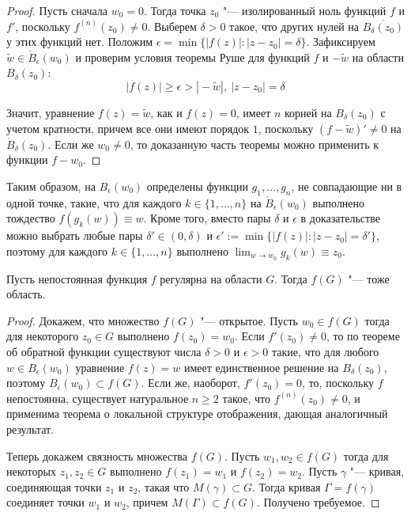 \begin{proof}
	Пусть сначала $w_0 = 0$. Тогда точка $z_0$ "--- изолированный ноль функций $f$ и $f'$, поскольку $f^{(n)}(z_0) \ne 0$. Выберем $\delta > 0$ такое, что других нулей на $\overline{B_\delta(z_0)}$ у этих функций нет. Положим $\epsilon = \min\{|f(z)| : |z - z_0| = \delta\}$. Зафиксируем $\widetilde w \in \mathring B_\epsilon(w_0)$ и проверим условия теоремы Руше для функций $f$ и $-\widetilde{w}$ на области $B_\delta(z_0)$:
	\[|f(z)| \ge \epsilon > |\!-\!\widetilde{w}|,~|z - z_0| = \delta\]
	
	Значит, уравнение $f(z) = \widetilde w$, как и $f(z) = 0$, имеет $n$ корней на $B_\delta(z_0)$ с учетом кратности, причем все они имеют порядок $1$, поскольку $(f- \widetilde w)' \ne 0$ на $\mathring B_\delta(z_0)$. Если же $w_0 \ne 0$, то доказанную часть теоремы можно применить к функции $f - w_0$.
\end{proof}

\begin{note}
	Таким образом, на $B_\epsilon(w_0)$ определены функции $g_1, \dotsc, g_n$, не совпадающие ни в одной точке, такие, что для каждого $k \in \{1, \dotsc, n\}$ на $\mathring B_\epsilon(w_0)$ выполнено тождество $f(g_k(w)) \equiv w$. Кроме того, вместо пары $\delta$ и $\epsilon$ в доказательстве можно выбрать любые пары $\delta' \in (0, \delta)$ и $\epsilon' := \min\{|f(z)| : |z - z_0| = \delta'\}$, поэтому для каждого $k \in \{1, \dotsc, n\}$ выполнено $\lim_{w \to w_0}g_k(w) \equiv z_0$.
\end{note}

\begin{theorem}
	Пусть непостоянная функция $f$ регулярна на области $G$. Тогда $f(G)$ "--- тоже область.
\end{theorem}

\begin{proof}
	Докажем, что множество $f(G)$ "--- открытое. Пусть $w_0 \in f(G)$ тогда для некоторого $z_0 \in G$ выполнено $f(z_0) = w_0$. Если $f'(z_0) \ne 0$, то по теореме об обратной функции существуют числа $\delta > 0$ и $\epsilon > 0$ такие, что для любого $w \in B_\epsilon(w_0)$ уравнение $f(z) = w$ имеет единственное решение на $B_\delta(z_0)$, поэтому $B_\epsilon(w_0) \subset f(G)$. Если же, наоборот, $f'(z_0) = 0$, то, поскольку $f$ непостоянна, существует натуральное $n \ge 2$ такое, что $f^{(n)}(z_0) \ne 0$, и применима теорема о локальной структуре отображения, дающая аналогичный результат.
	
	Теперь докажем связность множества $f(G)$. Пусть $w_1, w_2 \in f(G)$ тогда для некоторых $z_1, z_2 \in G$ выполнено $f(z_1) = w_1$ и $f(z_2) = w_2$. Пусть $\gamma$ "--- кривая, соединяющая точки $z_1$ и $z_2$, такая что $M(\gamma) \subset G$. Тогда кривая $\Gamma = f(\gamma)$ соединяет точки $w_1$ и $w_2$, причем $M(\Gamma) \subset f(G)$. Получено требуемое.
\end{proof}

